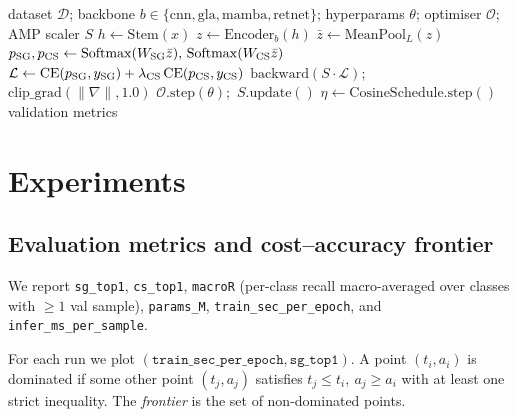 \documentclass[final]{ws-ijwmip}
\begin{document}
\begin{algorithm}[h]
\caption{LineXRD training loop (one epoch)}
\label{alg:train}
\begin{algorithmic}[1]
\Require dataset $\mathcal{D}$; backbone $b\in\{\mathrm{cnn},\mathrm{gla},\mathrm{mamba},\mathrm{retnet}\}$; hyperparams $\theta$; optimiser $\mathcal{O}$; AMP scaler $S$
  \State $h \leftarrow \mathrm{Stem}(x)$ 
  \State $z \leftarrow \mathrm{Encoder}_b(h)$ 
  \State $\bar z \leftarrow \mathrm{MeanPool}_L(z)$
  \State $p_{\rm SG}, p_{\rm CS} \leftarrow \mathrm{Softmax}(W_{\rm SG}\bar z),\,
                                    \mathrm{Softmax}(W_{\rm CS}\bar z)$
  \State $\mathcal{L} \leftarrow \mathrm{CE}(p_{\rm SG}, y_{\rm SG}) +
                                  \lambda_{\rm CS}\,\mathrm{CE}(p_{\rm CS}, y_{\rm CS})$
  \State $\mathrm{backward}(S\!\cdot\!\mathcal{L})$;
         $\mathrm{clip\_grad}(\|\nabla\|, 1.0)$
  \State $\mathcal{O}.\mathrm{step}(\theta)$;\, $S.\mathrm{update}()$
\EndFor
\State $\eta \leftarrow \mathrm{CosineSchedule}.\mathrm{step}()$
\State \Return validation metrics
\end{algorithmic}
\end{algorithm}


\section{Experiments}
\label{sec:exp}


\subsection{Evaluation metrics and cost--accuracy frontier}

We report \texttt{sg\_top1}, \texttt{cs\_top1}, \texttt{macroR}
(per-class recall macro-averaged over classes with $\geq 1$ val sample),
\texttt{params\_M}, \texttt{train\_sec\_per\_epoch}, and
\texttt{infer\_ms\_per\_sample}.

For each run we plot
$(\texttt{train\_sec\_per\_epoch}, \texttt{sg\_top1})$. A point
$(t_i, a_i)$ is dominated if some other point $(t_j, a_j)$ satisfies
$t_j\leq t_i,\ a_j\geq a_i$ with at least one strict inequality. The
\emph{frontier} is the set of non-dominated points.
\end{document}
